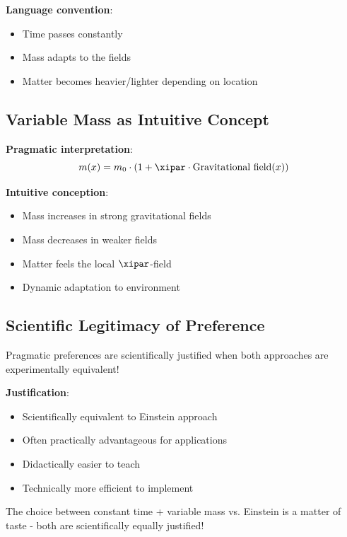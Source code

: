 	\textbf{Language convention}:
	\begin{itemize}
		\item Time passes constantly
		\item Mass adapts to the fields
		\item Matter becomes heavier/lighter depending on location
	\end{itemize}
	
	\subsection{Variable Mass as Intuitive Concept}
	
	\textbf{Pragmatic interpretation}:
	\begin{equation}
		m(x) = m_0 \cdot (1 + \xipar \cdot \text{Gravitational field}(x))
	\end{equation}
	
	\textbf{Intuitive conception}:
	\begin{itemize}
		\item Mass increases in strong gravitational fields
		\item Mass decreases in weaker fields
		\item Matter feels the local $\xipar$-field
		\item Dynamic adaptation to environment
	\end{itemize}
	
	\subsection{Scientific Legitimacy of Preference}
	
	\begin{tcolorbox}[colback=green!5!white,colframe=green!75!black,title=Important Insight]
		Pragmatic preferences are scientifically justified when both approaches are experimentally equivalent!
	\end{tcolorbox}
	
	\textbf{Justification}:
	\begin{itemize}
		\item Scientifically equivalent to Einstein approach
		\item Often practically advantageous for applications
		\item Didactically easier to teach
		\item Technically more efficient to implement
	\end{itemize}
	
	The choice between constant time + variable mass vs. Einstein is a matter of taste - both are scientifically equally justified!
	

